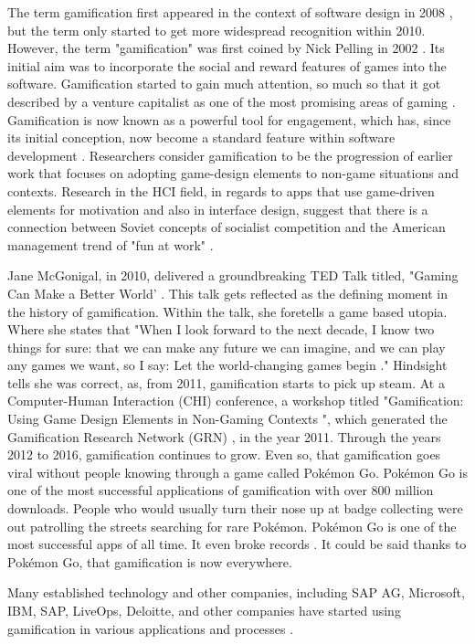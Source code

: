 \documentclass[sigchi]{acmart}
\begin{document}
The term gamification first appeared in the context of software design in 2008 \cite{4}, but the term only started to get more widespread recognition within 2010. However, the term "gamification" was first coined by Nick Pelling in 2002 \cite{3e}. Its initial aim was to incorporate the social and reward features of games into the software. Gamification started to gain much attention, so much so that it got described by a venture capitalist as one of the most promising areas of gaming \cite{5}. Gamification is now known as a powerful tool for engagement, which has, since its initial conception, now become a standard feature within software development \cite{3e}. Researchers consider gamification to be the progression of earlier work that focuses on adopting game-design elements to non-game situations and contexts. Research in the HCI field, in regards to apps that use game-driven elements for motivation and also in interface design, suggest that there is a connection between Soviet concepts of socialist competition and the American management trend of "fun at work" \cite{5}.

Jane McGonigal, in 2010, delivered a groundbreaking TED Talk titled, "Gaming Can Make a Better World' \cite{6}. This talk gets reflected as the defining moment in the history of gamification. Within the talk, she foretells a game based utopia. Where she states that "When I look forward to the next decade, I know two things for sure: that we can make any future we can imagine, and we can play any games we want, so I say: Let the world-changing games begin \cite{6}." Hindsight tells she was correct, as, from 2011, gamification starts to pick up steam.  At a Computer-Human Interaction (CHI) conference, a workshop titled "Gamification: Using Game Design Elements in Non-Gaming Contexts \cite{7}", which generated the Gamification Research Network (GRN) \cite{11}, in the year 2011. Through the years 2012 to 2016, gamification continues to grow. Even so, that gamification goes viral without people knowing through a game called Pokémon Go. Pokémon Go is one of the most successful applications of gamification with over 800 million downloads. People who would usually turn their nose up at badge collecting were out patrolling the streets searching for rare Pokémon. Pokémon Go is one of the most successful apps of all time. It even broke records \cite{3e,8}. It could be said thanks to Pokémon Go, that gamification is now everywhere. 

Many established technology and other companies, including SAP AG, Microsoft, IBM, SAP, LiveOps, Deloitte, and other companies have started using gamification in various applications and processes \cite{9}. 
\end{document}
